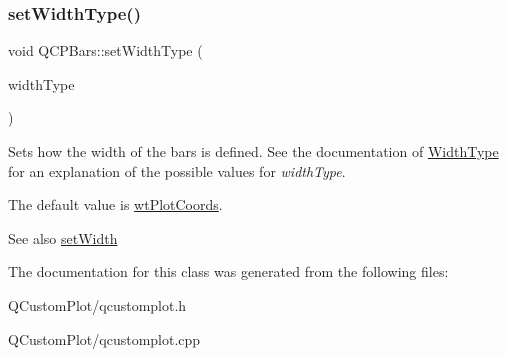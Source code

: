 \subsubsection{\texorpdfstring{set\+Width\+Type()}{setWidthType()}}
{\footnotesize\ttfamily void Q\+C\+P\+Bars\+::set\+Width\+Type (\begin{DoxyParamCaption}\item[{\mbox{\hyperlink{class_q_c_p_bars_a65dbbf1ab41cbe993d71521096ed4649}{Q\+C\+P\+Bars\+::\+Width\+Type}}}]{width\+Type }\end{DoxyParamCaption})}

Sets how the width of the bars is defined. See the documentation of \mbox{\hyperlink{class_q_c_p_bars_a65dbbf1ab41cbe993d71521096ed4649}{Width\+Type}} for an explanation of the possible values for {\itshape width\+Type}.

The default value is \mbox{\hyperlink{class_q_c_p_bars_a65dbbf1ab41cbe993d71521096ed4649aad3cc60ae1bfb1160a30237bee9eaf10}{wt\+Plot\+Coords}}.

\begin{DoxySeeAlso}{See also}
\mbox{\hyperlink{class_q_c_p_bars_afec6116579d44d5b706e0fa5e5332507}{set\+Width}} 
\end{DoxySeeAlso}


The documentation for this class was generated from the following files\+:\begin{DoxyCompactItemize}
\item 
Q\+Custom\+Plot/qcustomplot.\+h\item 
Q\+Custom\+Plot/qcustomplot.\+cpp\end{DoxyCompactItemize}
